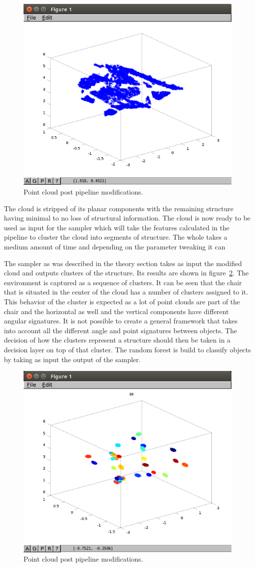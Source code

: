 \documentclass[twoside,hidelinks]{article}
\begin{document}
\begin{figure}[h!]
  \centering
    \includegraphics[width=.5\textwidth]{initial}
    \caption{Point cloud post pipeline modifications.}
  \label{pcl:reduced}
\end{figure}

The cloud is stripped of its planar components with the remaining structure having minimal to no loss of structural information. The cloud is now ready to be used as input for the sampler which will take the features calculated in the pipeline to cluster the cloud into segments of structure. The whole takes a medium amount of time and depending on the parameter tweaking it can 

The sampler as was described in the theory section takes as input the modified cloud and outputs clusters of the structure. Its results are shown in figure~\ref{pcl:clustering}. The environment is captured as a sequence of clusters. It can be seen that the chair that is situated in the center of the cloud has a number of clusters assigned to it. This behavior of the cluster is expected as a lot of point clouds are part of the chair and the horizontal as well and the vertical components have different angular signatures. It is not possible to create a general framework that takes into account all the different angle and point signatures between objects. The decision of how the clusters represent a structure should then be taken in a decision layer on top of that cluster. The random forest is build to classify objects by taking as input the output of the sampler.

\begin{figure}[h!]
  \centering
    \includegraphics[width=.5\textwidth]{clustering}
    \caption{Point cloud post pipeline modifications.}
  \label{pcl:clustering}
\end{figure}
\end{document}

